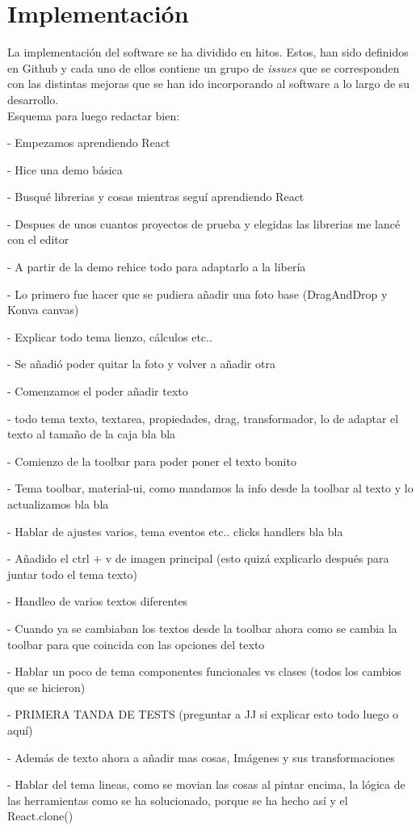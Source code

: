 \chapter{Implementación}

La implementación del software se ha dividido en hitos. Estos, han sido definidos en Github
y cada uno de ellos contiene un grupo de \textit{issues} que se corresponden con las distintas
mejoras que se han ido incorporando al software a lo largo de su desarrollo.\\

Esquema para luego redactar bien:

- Empezamos aprendiendo React

- Hice una demo básica

- Busqué librerias y cosas mientras seguí aprendiendo React

- Despues de unos cuantos proyectos de prueba y elegidas las librerias me lancé con el editor

- A partir de la demo rehice todo para adaptarlo a la libería 

- Lo primero fue hacer que se pudiera añadir una foto base (DragAndDrop y Konva canvas)

- Explicar todo tema lienzo, cálculos etc..

- Se añadió poder quitar la foto y volver a añadir otra

- Comenzamos el poder añadir texto

- todo tema texto, textarea, propiedades, drag, transformador, lo de adaptar el texto al tamaño de la caja bla bla 

- Comienzo de la toolbar para poder poner el texto bonito

- Tema toolbar, material-ui, como mandamos la info desde la toolbar al texto y lo actualizamos bla bla

- Hablar de ajustes varios, tema eventos etc.. clicks handlers bla bla

- Añadido el ctrl + v de imagen principal (esto quizá explicarlo después para juntar todo el tema texto)

- Handleo de varios textos diferentes

- Cuando ya se cambiaban los textos desde la toolbar ahora como se cambia la toolbar para que coincida con las opciones del texto

- Hablar un poco de tema componentes funcionales vs clases (todos los cambios que se hicieron)

- PRIMERA TANDA DE TESTS (preguntar a JJ si explicar esto todo luego o aquí)

- Además de texto ahora a añadir mas cosas, Imágenes y sus transformaciones

- Hablar del tema lineas, como se movian las cosas al pintar encima, la lógica de las herramientas
  como se ha solucionado, porque se ha hecho así y el React.clone()